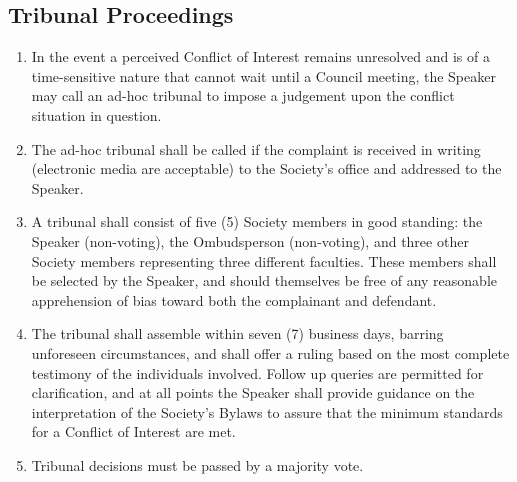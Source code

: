 \subsection{Tribunal Proceedings}
\begin{enumerate} [align=left]
\item  In the event a perceived Conflict of Interest remains unresolved and is of a time-sensitive nature that cannot wait until a Council meeting, the Speaker may call an ad-hoc tribunal to impose a judgement upon the conflict situation in question.
\item The ad-hoc tribunal shall be called if the complaint is received in writing (electronic media are acceptable) to the Society’s office and addressed to the Speaker.
\item A tribunal shall consist of five (5) Society members in good standing: the Speaker (non-voting), the Ombudsperson (non-voting), and three other Society members representing three different faculties. These members shall be selected by the Speaker, and should themselves be free of any reasonable apprehension of bias toward both the complainant and defendant.
\item The tribunal shall assemble within seven (7) business days, barring unforeseen circumstances, and shall offer a ruling based on the most complete testimony of the individuals involved. Follow up queries are permitted for clarification, and at all points the Speaker shall provide guidance on the interpretation of the Society’s Bylaws to assure that the minimum standards for a Conflict of Interest are met.
\item Tribunal decisions must be passed by a majority vote.
\end{enumerate}	


